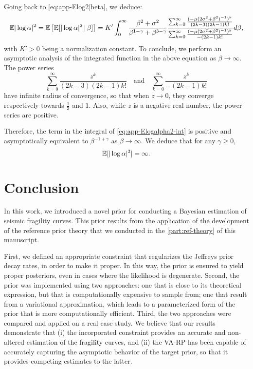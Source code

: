 Going back to \cref{eq:app-Elog2|beta}, we deduce:
    \begin{equation}\label{eq:app-Elogalpha2-int}
        \mathbb{E}|\log\alpha|^2 = \mathbb{E}\left[\mathbb{E}[|\log\alpha|^2\,|\,\beta]\right] = K'\int_0^\infty \frac{\beta^2+\sigma^2}{\beta^{1-\gamma}+\beta^{3-\gamma}}
        \frac{\sum_{k=0}^\infty \frac{(-\mu(2\sigma^2+\beta^2)^{-1})^k}{(2k-3)(2k-1)k!} }{\sum_{k=0}^\infty \frac{(-\mu(2\sigma^2+\beta^2)^{-1})^k}{-(2k-1)k!}}d\beta,
    \end{equation}
with $K'>0$ being a normalization constant.
To conclude, we perform an asymptotic analysis of the integrated function in the above equation as $\beta\to\infty$.
The power series 
    \begin{equation}
        \sum_{k=0}^\infty \frac{z^k}{(2k-3)(2k-1)k!} \quad\text{and}\quad 
        \sum_{k=0}^\infty \frac{z^k}{-(2k-1)k!}
    \end{equation}
have infinite radius of convergence, so that when $z\to0$, they converge respectively towards $\frac{1}{3}$ and $1$.
Also, while $z$ is a negative real number, the power series are positive.

Therefore, the term in the integral of \cref{eq:app-Elogalpha2-int} is positive and asymptotically equivalent to $\beta^{-1+\gamma}$ as $\beta\to\infty$. We deduce that for any $\gamma\geq0$,
    \begin{equation}
        \mathbb{E}[|\log\alpha|^2]=\infty.
    \end{equation}
    





\section{Conclusion}\label{sec:constr-frags:conclusion}




In this work, we introduced a novel prior for conducting a Bayesian estimation of seismic fragility curves.
This prior results from the application of the development of the reference prior theory that we conducted in the \cref{part:ref-theory} of this manuscript.

First, we defined an appropriate constraint that regularizes the Jeffreys prior decay rates, in order to make it proper. In this way, the prior is ensured to yield proper posteriors, even in cases where the likelihood is degenerate.
Second, the prior was implemented using two approaches: one that is close to its theoretical expression, but that is computationally expensive to sample from; one that result from a variational approximation, which leads to a parameterized form of the prior that is more computationally efficient.
Third, the two approaches were compared and applied on a real case study. 
We believe that our results demonstrate that (i) the incorporated constraint provides an accurate and non-altered estimation of the fragility curves, and (ii) the VA-RP has been capable of accurately capturing the asymptotic behavior of the target prior, so that it provides competing estimates to the latter.


